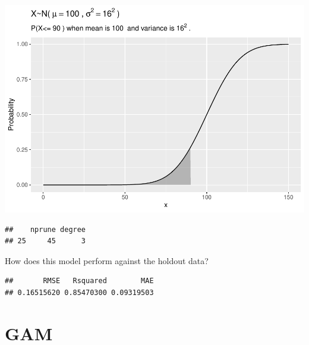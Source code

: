 \documentclass[]{book}
\newenvironment{Shaded}{\begin{snugshade}}{\end{snugshade}}
\newcommand{\DataTypeTok}[1]{\textcolor[rgb]{0.13,0.29,0.53}{#1}}
\newcommand{\KeywordTok}[1]{\textcolor[rgb]{0.13,0.29,0.53}{\textbf{#1}}}
\newcommand{\NormalTok}[1]{#1}
\newcommand{\OperatorTok}[1]{\textcolor[rgb]{0.81,0.36,0.00}{\textbf{#1}}}
\begin{document}
\includegraphics{data-sci_files/figure-latex/unnamed-chunk-21-1.pdf}

\begin{Shaded}
\end{Shaded}

\begin{verbatim}
##    nprune degree
## 25     45      3
\end{verbatim}

How does this model perform against the holdout data?

\begin{Shaded}
\end{Shaded}

\begin{verbatim}
##       RMSE   Rsquared        MAE 
## 0.16515620 0.85470300 0.09319503
\end{verbatim}

\hypertarget{gam}{%
\section{GAM}\label{gam}}
\end{document}
